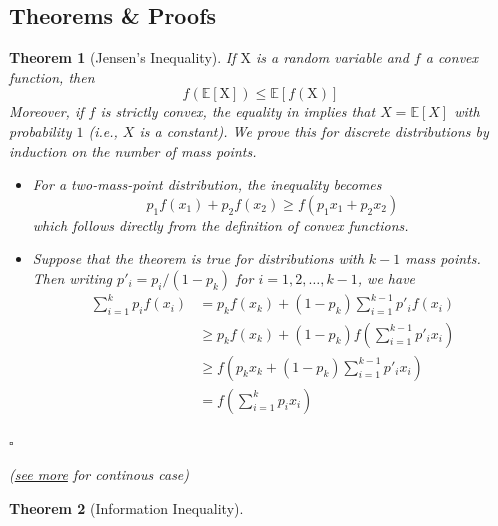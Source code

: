 \documentclass[12pt, a4paper]{article}
\newtheorem{theorem}{Theorem}
\newenvironment{proof}{{\newline\noindent\bf Proof}\quad}{\hfill $\square$\par}
\def\rmX{\mathrm{X}}
\begin{document}
\begin{appendices}
\section{Theorems \& Proofs}

\begin{theorem}[Jensen's Inequality]

    \label{theo:jensen}
    If $\rmX$ is a random variable and $f$ a convex function, then
    \[
        f(\mathbb{E}[\rmX]) \leq \mathbb{E}[f(\rmX)]
    \]
    Moreover, if $f$ is strictly convex, the equality in implies that $X = \mathbb{E}[X]$ with probability $1$ (i.e., $X$ is a constant).
    \newline
    \begin{proof}
        We prove this for discrete distributions by induction on the number of mass points.
        \begin{itemize}
            \item For a two-mass-point distribution, the inequality becomes
                \[
                    p_1 f(x_1) + p_2 f(x_2) \geq f(p_1x_1 + p_2x_2)
                \]
                which follows directly from the definition of convex functions.
            \item Suppose that the theorem is true for distributions with $k − 1$ mass points.
                Then writing $p'_i = p_i / (1 - p_k)$ for $i = 1, 2, \dots, k-1$, we have
                \[
                    \begin{split}
                        \sum_{i=1}^k p_i f(x_i) 
                        &= p_k f(x_k) + (1-p_k) \sum_{i=1}^{k-1} p'_i f(x_i)
                        \\&\geq p_k f(x_k) + (1-p_k) f \left( \sum_{i=1}^{k-1}p'_i x_i \right)
                        \\&\geq f \left( p_kx_k + (1-p_k)\sum_{i=1}^{k-1}p'_ix_i \right)
                        \\&= f \left( \sum_{i=1}^k p_ix_i \right)
                    \end{split}
                \]
        \end{itemize}
    \end{proof}

    (\href{https://en.wikipedia.org/wiki/Jensen%27s_inequality}{see more} for continous case)

\end{theorem}

\begin{theorem}[Information Inequality]
\label{theo:dkl}


\end{theorem}
\end{appendices}
\end{document}
